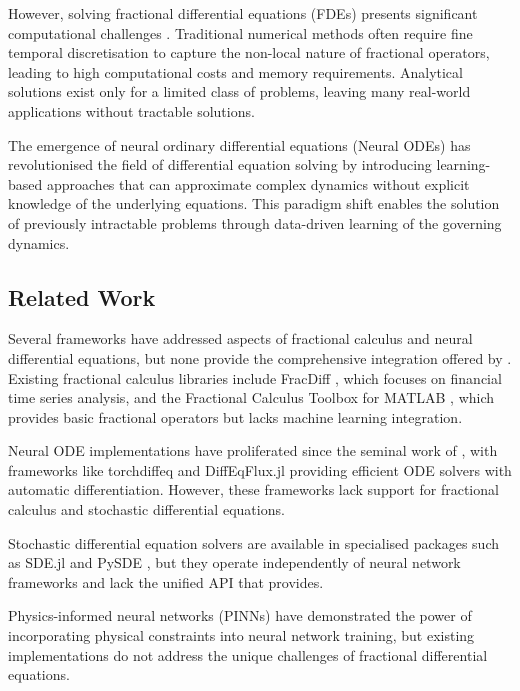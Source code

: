 However, solving fractional differential equations (FDEs) presents significant computational challenges \citep{Gong2015ComputationalChallengeFDE}. Traditional numerical methods often require fine temporal discretisation to capture the non-local nature of fractional operators, leading to high computational costs and memory requirements. Analytical solutions exist only for a limited class of problems, leaving many real-world applications without tractable solutions.

The emergence of neural ordinary differential equations (Neural ODEs) \citep{chen2018neural} has revolutionised the field of differential equation solving by introducing learning-based approaches that can approximate complex dynamics without explicit knowledge of the underlying equations. This paradigm shift enables the solution of previously intractable problems through data-driven learning of the governing dynamics.

\subsection{Related Work}

Several frameworks have addressed aspects of fractional calculus and neural differential equations, but none provide the comprehensive integration offered by \hpfracc. Existing fractional calculus libraries include FracDiff \citep{fracdiff}, which focuses on financial time series analysis, and the Fractional Calculus Toolbox for MATLAB \citep{matlab_fractional}, which provides basic fractional operators but lacks machine learning integration.

Neural ODE implementations have proliferated since the seminal work of \citet{chen2018neural}, with frameworks like torchdiffeq \citep{torchdiffeq} and DiffEqFlux.jl \citep{diffeqflux} providing efficient ODE solvers with automatic differentiation. However, these frameworks lack support for fractional calculus and stochastic differential equations.

Stochastic differential equation solvers are available in specialised packages such as SDE.jl \citep{sde_jl} and PySDE \citep{pysde}, but they operate independently of neural network frameworks and lack the unified API that \hpfracc provides.

Physics-informed neural networks (PINNs) \citep{raissi2019physics} have demonstrated the power of incorporating physical constraints into neural network training, but existing implementations do not address the unique challenges of fractional differential equations.

